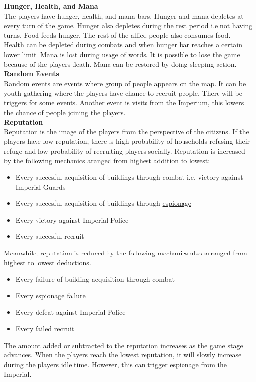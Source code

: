 \documentclass[11pt]{article}
\begin{document}
\textbf{Hunger, Health, and Mana}\\
The players have hunger, health, and mana bars. Hunger and mana depletes at every turn of the game. Hunger also depletes during the rest period i.e not having turns. Food feeds hunger. The rest of the allied people also consumes food. Health can be depleted during combats and when hunger bar reaches a certain lower limit. Mana is lost  during usage of words. It is possible to lose the game because of the players death. Mana can be restored by doing sleeping action.\\

\textbf{Random Events}\\
Random events are events where group of people appears on the map. It can be youth gathering where the players have chance to recruit people. There will be triggers for some events. Another event is visits from the Imperium, this lowers the chance of people joining the players.\\

\hypertarget{reputation}{\textbf{Reputation}}\\
Reputation is the image of the players from the perspective of the citizens. If the players have low reputation, there is high probability of households refusing their refuge and low probability of recruiting players socially.
Reputation is increased by the following mechanics aranged from highest addition to lowest:
\begin{itemize}
\item
  Every succesful acquisition of buildings through combat i.e. victory against Imperial Guards 
\item
  Every succesful acquisition of buildings through \hyperlink{espionage}{espionage}
\item
  Every victory against Imperial Police
\item
  Every succesful recruit
\end{itemize}
Meanwhile, reputation is reduced by the following mechanics also arranged from highest to lowest deductions.
\begin{itemize}
\item
  Every failure of building acquisition through combat
\item
  Every espionage failure
\item
  Every defeat against Imperial Police
\item
  Every failed recruit
\end{itemize}
The amount added or subtracted to the reputation increases as the game stage advances. When the players reach the lowest reputation, it will slowly increase during the players idle time. However, this can trigger espionage from the Imperial.\\
\end{document}

